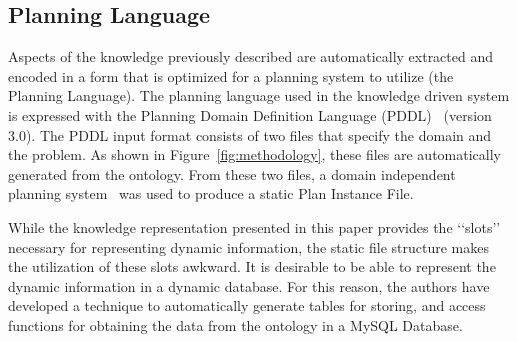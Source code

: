 

\subsection{Planning Language}
\label{subsection:planning_language}
Aspects of the knowledge previously described are automatically extracted and encoded in a form that is optimized for a planning system to utilize (the Planning Language). The planning language used in the knowledge driven system is expressed with the Planning Domain Definition Language (PDDL)~\cite{PDDL} (version 3.0). The PDDL input format consists of two files that specify the domain and the problem. As shown in Figure~\ref{fig:methodology}, these files are automatically generated from the ontology. From these two files, a domain independent planning system~\cite{Coles.ICAPS.2010} was used to produce a static \textsf{Plan Instance File}.



While the knowledge representation presented in this paper provides the \lq\lq{}slots\rq\rq{} necessary for representing dynamic information, the
static file structure makes the utilization of these slots awkward. It is desirable to be able to represent the dynamic information in a dynamic database.
For this reason, the authors have developed a technique to automatically generate tables for storing, and access functions
for obtaining the data from the ontology in a \textsf{MySQL Database}.

